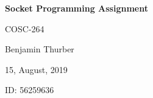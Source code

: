 \documentclass[12pt, oneside]{article}   	%
\begin{document}
\begin{center}
\LARGE{\textbf{Socket Programming Assignment}}	%
\end{center}
\vspace{-1mm}
\begin{flushright}
\large{COSC-264}
\end{flushright}
\vspace{-11mm}
\large{Benjamin Thurber}			%
\vspace{0mm}
\begin{center}
\centerline{\large{15, August, 2019}}
\end{center}

\vspace{-10mm}
\begin{flushleft}
ID: 56259636

\end{flushleft}

\footnotesize

\vspace{-1mm}
\end{document}
